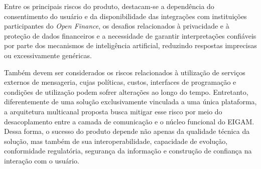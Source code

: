 Entre os principais riscos do produto, destacam-se a dependência do consentimento do usuário e da disponibilidade das integrações com instituições participantes do \textit{Open Finance}, os desafios relacionados à privacidade e à proteção de dados financeiros e a necessidade de garantir interpretações confiáveis por parte dos mecanismos de inteligência artificial, reduzindo respostas imprecisas ou excessivamente genéricas.

Também devem ser considerados os riscos relacionados à utilização de serviços externos de mensageria, cujas políticas, custos, interfaces de programação e condições de utilização podem sofrer alterações ao longo do tempo. Entretanto, diferentemente de uma solução exclusivamente vinculada a uma única plataforma, a arquitetura multicanal proposta busca mitigar esse risco por meio do desacoplamento entre a camada de comunicação e o núcleo funcional do EIGAM. Dessa forma, o sucesso do produto depende não apenas da qualidade técnica da solução, mas também de sua interoperabilidade, capacidade de evolução, conformidade regulatória, segurança da informação e construção de confiança na interação com o usuário.


